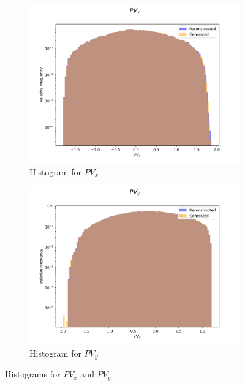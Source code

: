 \documentclass{article}
\begin{document}
\begin{figure}[H]
    \centering
    \begin{subfigure}[b]{0.45\textwidth}
        \includegraphics[width=\textwidth]{graphs/hadr_PV_x.png}
        \caption{Histogram for $PV_x$}
        \label{fig:had_PV_x}
    \end{subfigure}
    \hfill
    \begin{subfigure}[b]{0.45\textwidth}
        \includegraphics[width=\textwidth]{graphs/hadr_PV_y.png}
        \caption{Histogram for $PV_y$}
        \label{fig:had_PV_y}
    \end{subfigure}
    \caption{Histograms for $PV_x$ and $PV_y$}
\end{figure}
\end{document}
